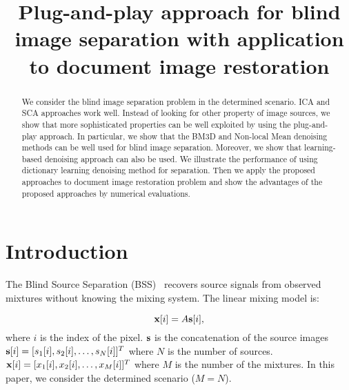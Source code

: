 \documentclass[conference]{IEEEtran}
\theoremstyle{plain}
\begin{document}
\title{Plug-and-play approach for blind image separation with application to document image restoration}

\author{
}	

\maketitle

\begin{abstract}
	We consider the blind image separation problem in the determined scenario. ICA and SCA approaches work well. Instead of looking for other property of image sources, we show that more sophisticated properties can be well exploited by using the plug-and-play approach. In particular, we show that the BM3D and Non-local Mean denoising methods can be well used for blind image separation. Moreover, we show that learning-based denoising approach can also be used. We illustrate the performance of using dictionary learning denoising method for separation. Then we apply the proposed approaches to document image restoration problem and show the advantages of the proposed approaches by numerical evaluations. 
\end{abstract}


\section{Introduction}
The Blind Source Separation (BSS)~\cite{comon2010handbook} recovers source signals from observed mixtures without knowing the mixing system. The linear mixing model is:

\begin{equation}
\label{eq: linear mixing}
\bx[i] = A \bs[i],
\end{equation}
where $i$ is the index of the pixel. ${\mathbf s}$ is the concatenation of the source images ${\mathbf s}[i] = [s_1[i], s_2[i], \ldots, s_N[i]]^T$ where $N$ is the number of sources. ${\mathbf x}[i] = [x_1[i], x_2[i], \ldots, x_M[i]]^T$ where $M$ is the number of the mixtures. In this paper, we consider the determined scenario ($M = N$).
\end{document}
